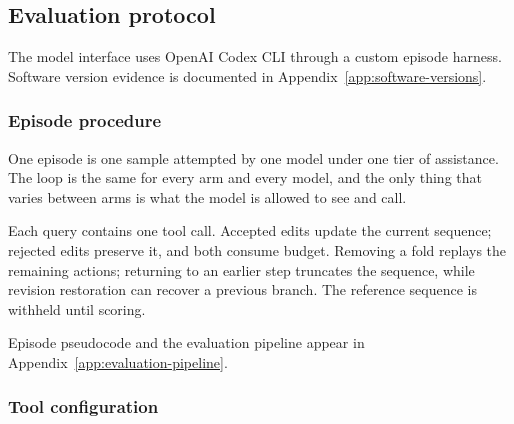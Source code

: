 \subsection{Evaluation protocol}
\label{sec:experiments}

The model interface uses OpenAI Codex CLI \citep{openai-codex} through a custom
episode harness. Software version evidence is documented in
Appendix~\ref{app:software-versions}.

\subsubsection{Episode procedure}
\label{sec:exp-pipeline}

One episode is one sample attempted by one model under one tier of assistance. The loop is the same
for every arm and every model, and the only thing that varies between arms is what the model is
allowed to see and call.

Each query contains one tool call. Accepted edits update the current sequence;
rejected edits preserve it, and both consume budget. Removing a fold replays the remaining actions;
returning to an earlier step truncates the sequence, while revision restoration can recover a
previous branch. The reference sequence is withheld until scoring.

Episode pseudocode and the evaluation pipeline appear in
Appendix~\ref{app:evaluation-pipeline}.

\subsubsection{Tool configuration}
\label{sec:exp-tools}

